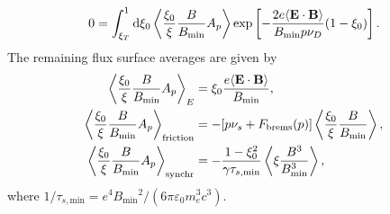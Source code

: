 \documentclass[11pt,a4paper]{article}
\newcommand{\rd}{\ensuremath{\mathrm{d}}}
\newcommand{\sub}[1]{\ensuremath{_{\text{#1}}}}
\renewcommand{\b}[1]{\ensuremath{ {\bf #1 } }}
\begin{document}
\begin{align}
0 = \int_{\xi_T}^1\rd \xi_0 \left\langle \frac{\xi_0}{\xi}\frac{B}{B\sub{min}} A_p   \right\rangle \exp \left[-\frac{2e\langle \b{E}\cdot\b{B}\rangle}{B\sub{min} p \nu_D}(1-\xi_0) \right] .
\end{align}
The remaining flux surface averages are given by
\begin{align}
\left\langle \frac{\xi_0}{\xi}\frac{B}{B\sub{min}} A_p   \right\rangle_E &= \xi_0\frac{e \langle\b{E}\cdot\b{B}\rangle}{B\sub{min}}, \nonumber \\
\left\langle \frac{\xi_0}{\xi}\frac{B}{B\sub{min}} A_p   \right\rangle\sub{friction} &= -[p\nu_s + F\sub{brems}(p)]\left\langle \frac{\xi_0}{\xi}\frac{B}{B\sub{min}} \right\rangle, \nonumber \\
\left\langle \frac{\xi_0}{\xi}\frac{B}{B\sub{min}} A_p   \right\rangle\sub{synchr} &= -\frac{1-\xi_0^2}{\gamma \tau_{s,\text{min}}}\left\langle \xi\frac{B^3}{B\sub{min}^3}  \right\rangle,
\end{align}
where $1/\tau_{s,\text{min}} = e^4 B\sub{min}^2/(6\pi\varepsilon_0 m_e^3 c^3)$.


%
\end{document}
